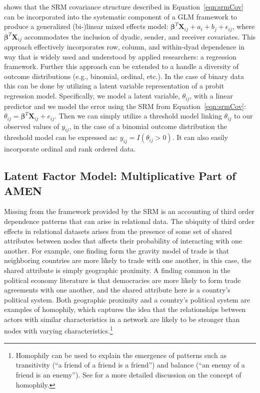 \citet{hoff:2005} shows that the SRM covariance structure described in Equation~\ref{eqn:srmCov} can be incorporated into the systematic component of a GLM framework to produce a generalized (bi-)linear mixed effects model: $\bm\beta^{T} \mathbf{X}_{ij} + a_{i} + b_{j} + \epsilon_{ij}$, where $ \bm\beta^{T} \mathbf{X}_{ij}$ accommodates the inclusion of dyadic, sender, and receiver covariates. This approach  effectively incorporates row, column, and within-dyad dependence in way that is widely used and understood by applied researchers: a regression framework. Further this approach can be extended to a handle a diversity of outcome distributions (e.g., binomial, ordinal, etc.). In the case of binary data this can be done by utilizing a latent variable representation of a probit regression model. Specifically, we model a latent variable, $\theta_{ij}$, with a linear predictor and we model the error using the SRM from Equation~\ref{eqn:srmCov}: $\theta_{ij} = \bm\beta^{T} \mathbf{X}_{ij} + e_{ij}$. Then we can simply utilize a threshold model linking $\theta_{ij}$ to our observed values of $y_{ij}$, in the case of a binomial outcome distribution the threshold model can be expressed as: $y_{ij} = I(\theta_{ij}>0)$.  It can also easily incorporate ordinal and rank ordered data.


\subsection{Latent Factor Model: Multiplicative Part of AMEN}

Missing from the framework provided by the SRM is an accounting of third order dependence patterns that can arise in relational data. The ubiquity of third order effects in relational datasets arises from the presence of some set of shared attributes between nodes that affects their probability of interacting with one another. For example, one finding form the gravity model of trade is that neighboring countries are more likely to trade with one another, in this case, the shared attribute is simply geographic proximity. A finding common in the political economy literature is that democracies are more likely to form trade agreements with one another, and the shared attribute here is a country's political system. Both geographic proximity and a country's political system are examples of homophily, which captures the idea that the relationships between actors with similar characteristics in a network are likely to be stronger than nodes with varying characteristics.\footnote{Homophily can be used to explain the emergence of patterns such as transitivity (``a friend of a friend is a friend'') and balance (``an enemy of a friend is an enemy''). See \citet{shalizi:thomas:2011} for a more detailed discussion on the concept of homophily.} 

